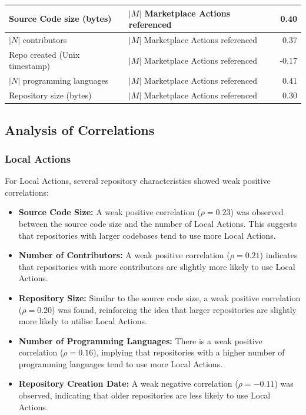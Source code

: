 \documentclass[conference]{IEEEtran}
\begin{document}
\begin{table}[h]
\begin{tabular}{|l|l|r|}
              \hline
              Source Code size (bytes) & $|M|$ Marketplace Actions referenced & 0.40 \\
              \hline
              $|N|$ contributors & $|M|$ Marketplace Actions referenced & 0.37 \\
              \hline
              Repo created (Unix timestamp) & $|M|$ Marketplace Actions referenced & -0.17 \\
              \hline
              $|N|$ programming languages & $|M|$ Marketplace Actions referenced & 0.41 \\
              \hline
              Repository size (bytes) & $|M|$ Marketplace Actions referenced & 0.30 \\
              \hline
          \end{tabular}
      \end{table}
      
      \subsection{Analysis of Correlations}
      
      \subsubsection{Local Actions}
      For Local Actions, several repository characteristics showed weak positive correlations:
      
      \begin{itemize}
          \item \textbf{Source Code Size:} A weak positive correlation (\(\rho = 0.23\)) was observed between the source code size and the number of Local Actions. This suggests that repositories with larger codebases tend to use more Local Actions.
          \item \textbf{Number of Contributors:} A weak positive correlation (\(\rho = 0.21\)) indicates that repositories with more contributors are slightly more likely to use Local Actions.
          \item \textbf{Repository Size:} Similar to the source code size, a weak positive correlation (\(\rho = 0.20\)) was found, reinforcing the idea that larger repositories are slightly more likely to utilise Local Actions.
          \item \textbf{Number of Programming Languages:} There is a weak positive correlation (\(\rho = 0.16\)), implying that repositories with a higher number of programming languages tend to use more Local Actions.
          \item \textbf{Repository Creation Date:} A weak negative correlation (\(\rho = -0.11\)) was observed, indicating that older repositories are less likely to use Local Actions.\\
      \end{itemize}
      
\end{document}
